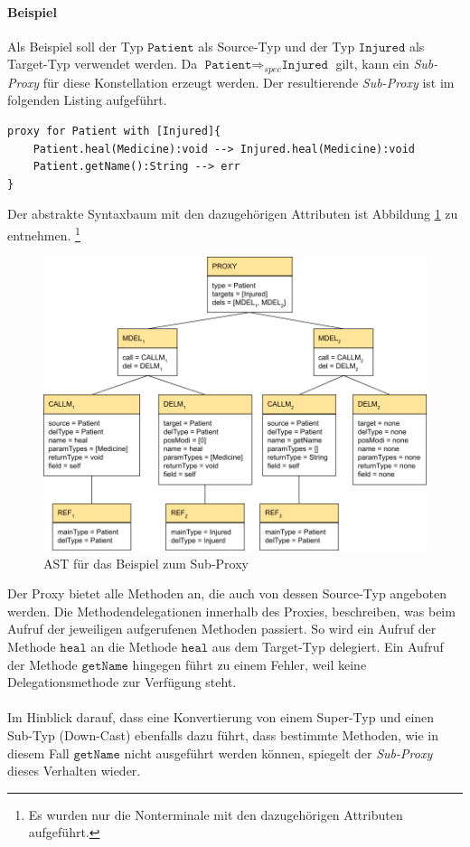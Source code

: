 \documentclass[a4paper,12pt]{article}
\begin{document}
\paragraph{Beispiel}
Als Beispiel soll  der Typ $\texttt{Patient}$ als Source-Typ und der Typ $\texttt{Injured}$ als Target-Typ verwendet werden. Da $\texttt{Patient} \Rightarrow_{spec} \texttt{Injured}$ gilt, kann ein \emph{Sub-Proxy} für diese Konstellation erzeugt werden. Der resultierende \emph{Sub-Proxy} ist im folgenden Listing aufgeführt.
\begin{lstlisting}[style = dsl, caption = Sub-Proxy für Patient, captionpos = b]
proxy for Patient with [Injured]{
	Patient.heal(Medicine):void --> Injured.heal(Medicine):void
	Patient.getName():String --> err
}
\end{lstlisting}
Der abstrakte Syntaxbaum mit den dazugehörigen Attributen ist Abbildung \ref{fig:ASTSUB} zu entnehmen. \footnote{Es wurden nur die Nonterminale mit den dazugehörigen Attributen aufgeführt.}
\begin{figure}[h!]
\includegraphics[width=\linewidth]{AST_SubExample}
\caption{AST für das Beispiel zum Sub-Proxy}
\label{fig:ASTSUB}
\end{figure}
\noindent
Der Proxy bietet alle Methoden an, die auch von dessen Source-Typ angeboten werden. Die Methodendelegationen innerhalb des Proxies, beschreiben, was beim Aufruf der jeweiligen aufgerufenen Methoden passiert. So wird ein Aufruf der Methode $\texttt{heal}$ an die Methode $\texttt{heal}$ aus dem Target-Typ delegiert. Ein Aufruf der Methode $\texttt{getName}$ hingegen führt zu einem Fehler, weil keine Delegationsmethode zur Verfügung steht.\\\\
Im Hinblick darauf, dass eine Konvertierung von einem Super-Typ und einen Sub-Typ (Down-Cast) ebenfalls dazu führt, dass bestimmte Methoden, wie in diesem Fall $\texttt{getName}$ nicht ausgeführt werden können, spiegelt der \emph{Sub-Proxy} dieses Verhalten wieder.
\end{document}
